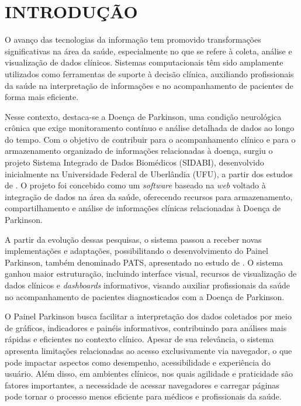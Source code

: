 
\chapter{INTRODUÇÃO}
\label{chap:introducao}


O avanço das tecnologias da informação tem promovido transformações significativas na área da saúde, especialmente no que se refere à coleta, análise e visualização de dados clínicos. Sistemas computacionais têm sido amplamente utilizados como ferramentas de suporte à decisão clínica, auxiliando profissionais da saúde na interpretação de informações e no acompanhamento de pacientes de forma mais eficiente.

Nesse contexto, destaca-se a Doença de Parkinson, uma condição neurológica crônica que exige monitoramento contínuo e análise detalhada de dados ao longo do tempo. Com o objetivo de contribuir para o acompanhamento clínico e para o armazenamento organizado de informações relacionadas à doença, surgiu o projeto Sistema Integrado de Dados Biomédicos (SIDABI), desenvolvido inicialmente na Universidade Federal de Uberlândia (UFU), a partir dos estudos de . O projeto foi concebido como um \textit{software} baseado na \textit{web} voltado à integração de dados na área da saúde, oferecendo recursos para armazenamento, compartilhamento e análise de informações clínicas relacionadas à Doença de Parkinson.

A partir da evolução dessas pesquisas, o sistema passou a receber novas implementações e adaptações, possibilitando o desenvolvimento do Painel Parkinson, também denominado PATS, apresentado no estudo de . O sistema ganhou maior estruturação, incluindo interface visual, recursos de visualização de dados clínicos e \textit{dashboards }informativos, visando auxiliar profissionais da saúde no acompanhamento de pacientes diagnosticados com a Doença de Parkinson.

O Painel Parkinson busca facilitar a interpretação dos dados coletados por meio de gráficos, indicadores e painéis informativos, contribuindo para análises mais rápidas e eficientes no contexto clínico. Apesar de sua relevância, o sistema apresenta limitações relacionadas ao acesso exclusivamente via navegador, o que pode impactar aspectos como desempenho, acessibilidade e experiência do usuário. Além disso, em ambientes clínicos, nos quais agilidade e praticidade são fatores importantes, a necessidade de acessar navegadores e carregar páginas pode tornar o processo menos eficiente para médicos e profissionais da saúde.

